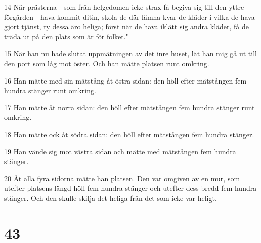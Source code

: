\par 14 När prästerna - som från helgedomen icke strax få begiva sig till den yttre förgården - hava kommit ditin, skola de där lämna kvar de kläder i vilka de hava gjort tjänst, ty dessa äro heliga; först när de hava iklätt sig andra kläder, få de träda ut på den plats som är för folket."
\par 15 När han nu hade slutat uppmätningen av det inre huset, lät han mig gå ut till den port som låg mot öster. Och han mätte platsen runt omkring.
\par 16 Han mätte med sin mätstång åt östra sidan: den höll efter mätstången fem hundra stänger runt omkring.
\par 17 Han mätte åt norra sidan: den höll efter mätstången fem hundra stänger runt omkring.
\par 18 Han mätte ock åt södra sidan: den höll efter mätstången fem hundra stänger.
\par 19 Han vände sig mot västra sidan och mätte med mätstången fem hundra stänger.
\par 20 Åt alla fyra sidorna mätte han platsen. Den var omgiven av en mur, som utefter platsens längd höll fem hundra stänger och utefter dess bredd fem hundra stänger. Och den skulle skilja det heliga från det som icke var heligt.

\chapter{43}

